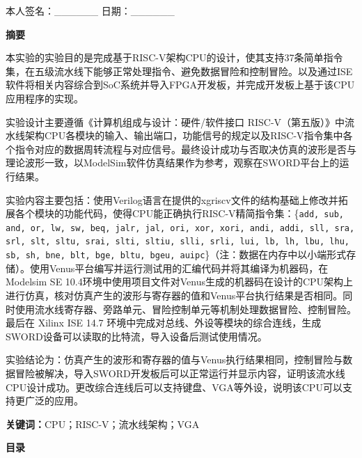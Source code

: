 \documentclass[UTF8,a4paper,autofakebold,15pt]{ctexart}
\begin{document}
	本人签名：\_\_\_\_\_\_          日期：\_\_\_\_\_\_
	
\newpage

	
	\begin{center}
		{\bf 摘\quad 要}
	\end{center}
	
	
	本实验的实验目的是完成基于RISC-V架构CPU的设计，使其支持37条简单指令集，在五级流水线下能够正常处理指令、避免数据冒险和控制冒险。以及通过ISE软件将相关内容综合到SoC系统并导入FPGA开发板，并完成开发板上基于该CPU应用程序的实现。
	
	实验设计主要遵循《计算机组成与设计：硬件/软件接口 RISC-V（第五版）》\cite{ref1}中流水线架构CPU各模块的输入、输出端口，功能信号的规定以及RISC-V指令集中各个指令对应的数据周转流程与对应信号。最终设计成功与否取决仿真的波形是否与理论波形一致，以ModelSim软件仿真结果作为参考，观察在SWORD平台上的运行结果。
	
	实验内容主要包括：使用Verilog语言在提供的xgriscv文件的结构基础上修改并拓展各个模块的功能代码，使得CPU能正确执行RISC-V精简指令集：\{{\tt add, sub, and, or, lw, sw, beq, jalr, jal, ori, xor, xori, andi, addi, sll, sra, srl, slt, sltu, srai, slti, sltiu, slli, srli, lui, lb, lh, lbu, lhu, sb, sh, bne, blt, bge, bltu, bgeu, auipc}\}（注：数据在内存中以小端形式存储）。使用Venus平台编写并运行测试用的汇编代码并将其编译为机器码，在Modelsim SE 10.4环境中使用项目文件对Venus生成的机器码在设计的CPU架构上进行仿真，核对仿真产生的波形与寄存器的值和Venus平台执行结果是否相同。同时使用流水线寄存器、旁路单元、冒险控制单元等机制处理数据冒险、控制冒险。最后在 Xilinx ISE 14.7 环境中完成对总线、外设等模块的综合连线，生成SWORD设备可以读取的比特流，导入设备后测试使用情况。
	
	实验结论为：仿真产生的波形和寄存器的值与Venus执行结果相同，控制冒险与数据冒险被解决，导入SWORD开发板后可以正常运行并显示内容，证明该流水线CPU设计成功。更改综合连线后可以支持键盘、VGA等外设，说明该CPU可以支持更广泛的应用。
	
	
	{\bf 关键词：}CPU；RISC-V；流水线架构；VGA
	
\newpage

	
	\begin{center}
		{\bf 目\quad 录}
	\end{center}
	
	
	\renewcommand{\contentsname}{}
	
	\tableofcontents
	
\end{document}
